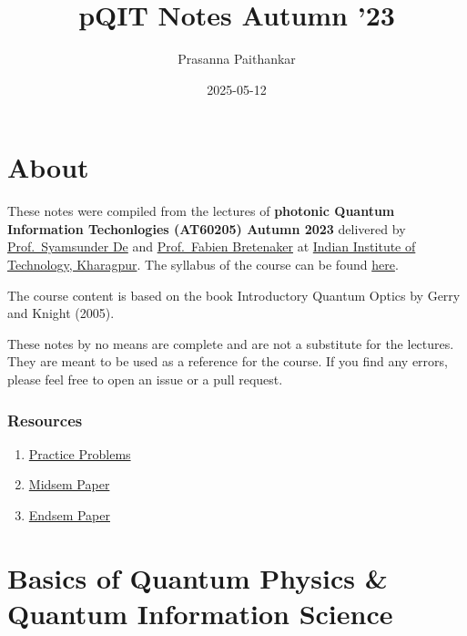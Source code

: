 \documentclass[
  letterpaper,
  DIV=11,
  numbers=noendperiod]{scrreprt}
\title{pQIT Notes Autumn '23}
\author{Prasanna Paithankar}
\date{2025-05-12}
\providecommand{\tightlist}{%
  \setlength{\itemsep}{0pt}\setlength{\parskip}{0pt}}\usepackage{longtable,booktabs,array}
\renewcommand*\contentsname{Table of contents}
\newcommand\contentsname{Table of contents}
\begin{document}
\maketitle

\renewcommand*\contentsname{Table of contents}
{
\hypersetup{linkcolor=}
\setcounter{tocdepth}{2}
\tableofcontents
}

\chapter*{About}\label{about}


These notes were compiled from the lectures of \textbf{photonic Quantum
Information Techonlogies (AT60205) Autumn 2023} delivered by
\href{https://www.iitkgp.ac.in/department/AT/faculty/at-syamsundarde}{Prof.~Syamsunder
De} and
\href{https://scholar.google.co.in/citations?user=im2WPmIAAAAJ&hl=en}{Prof.~Fabien
Bretenaker} at \href{https://www.iitkgp.ac.in/}{Indian Institute of
Technology, Kharagpur}. The syllabus of the course can be found
\href{./Syllabus.pdf}{here}.

The course content is based on the book Introductory Quantum Optics by
Gerry and Knight (2005).

These notes by no means are complete and are not a substitute for the
lectures. They are meant to be used as a reference for the course. If
you find any errors, please feel free to open an issue or a pull
request.

\subsection*{Resources}\label{resources}

\begin{enumerate}
\def\labelenumi{\arabic{enumi}.}
\tightlist
\item
  \href{}{Practice Problems}
\item
  \href{}{Midsem Paper}
\item
  \href{}{Endsem Paper}
\end{enumerate}


\chapter*{Basics of Quantum Physics \& Quantum Information
Science}\label{basics-of-quantum-physics-quantum-information-science}
\end{document}
